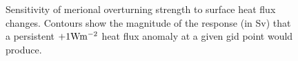 \begin{figure}
  \begin{center}
  \end{center}
\caption{Sensitivity of merional overturning strength to surface heat flux
changes. Contours show the magnitude of the response (in Sv) that a persistent
$+1{\rm W}{\rm m}^{-2}$ heat flux anomaly at a given gid point would
produce.}
\label{fig:hf-sensitivity}
\end{figure}
